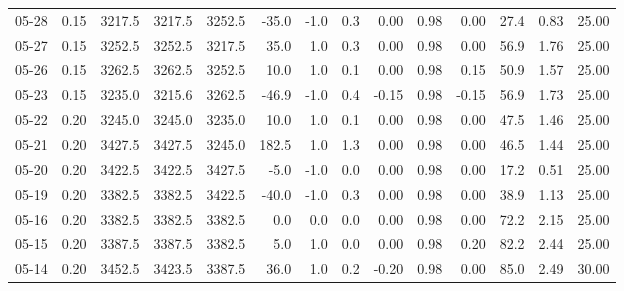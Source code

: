 \begin{threeparttable}
{\begin{tabular}{lrrrrrrrrrrrrr}
  05-28 &     0.15 & 3217.5 & 3217.5 & 3252.5 &      -35.0 &                     -1.0 &                 0.3 &       0.00 &      0.98 &           0.00 &             27.4 &            0.83 &                  25.00 \\
  05-27 &     0.15 & 3252.5 & 3252.5 & 3217.5 &       35.0 &                      1.0 &                 0.3 &       0.00 &      0.98 &           0.00 &             56.9 &            1.76 &                  25.00 \\
  05-26 &     0.15 & 3262.5 & 3262.5 & 3252.5 &       10.0 &                      1.0 &                 0.1 &       0.00 &      0.98 &           0.15 &             50.9 &            1.57 &                  25.00 \\
  05-23 &     0.15 & 3235.0 & 3215.6 & 3262.5 &      -46.9 &                     -1.0 &                 0.4 &      -0.15 &      0.98 &          -0.15 &             56.9 &            1.73 &                  25.00 \\
  05-22 &     0.20 & 3245.0 & 3245.0 & 3235.0 &       10.0 &                      1.0 &                 0.1 &       0.00 &      0.98 &           0.00 &             47.5 &            1.46 &                  25.00 \\
  05-21 &     0.20 & 3427.5 & 3427.5 & 3245.0 &      182.5 &                      1.0 &                 1.3 &       0.00 &      0.98 &           0.00 &             46.5 &            1.44 &                  25.00 \\
  05-20 &     0.20 & 3422.5 & 3422.5 & 3427.5 &       -5.0 &                     -1.0 &                 0.0 &       0.00 &      0.98 &           0.00 &             17.2 &            0.51 &                  25.00 \\
  05-19 &     0.20 & 3382.5 & 3382.5 & 3422.5 &      -40.0 &                     -1.0 &                 0.3 &       0.00 &      0.98 &           0.00 &             38.9 &            1.13 &                  25.00 \\
  05-16 &     0.20 & 3382.5 & 3382.5 & 3382.5 &        0.0 &                      0.0 &                 0.0 &       0.00 &      0.98 &           0.00 &             72.2 &            2.15 &                  25.00 \\
  05-15 &     0.20 & 3387.5 & 3387.5 & 3382.5 &        5.0 &                      1.0 &                 0.0 &       0.00 &      0.98 &           0.20 &             82.2 &            2.44 &                  25.00 \\
  05-14 &     0.20 & 3452.5 & 3423.5 & 3387.5 &       36.0 &                      1.0 &                 0.2 &      -0.20 &      0.98 &           0.00 &             85.0 &            2.49 &                  30.00 \\

\end{tabular}}
\end{threeparttable}
